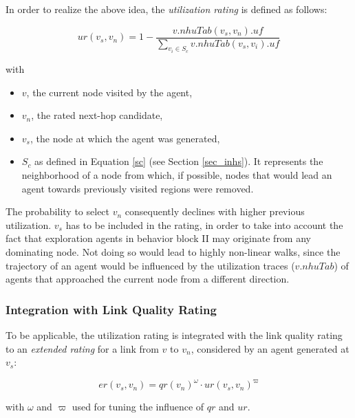 In order to realize the above idea, the \emph{utilization rating} is defined as follows:

	\begin{equation}
	   ur(v_s,v_n)=1 - \frac{v.nhuTab(v_s, v_n).uf}{\sum_{v_i \in S_{c}}{v.nhuTab(v_s, v_i).uf}}
	\label{ur}
	\end{equation}
	
with 

\begin{itemize}

	\item $v$, the current node visited by the agent,
	
	\item $v_n$, the rated next-hop candidate,
	
	\item $v_s$, the node at which the agent was generated,
	
	\item $S_c$ as defined in Equation \ref{sc} (see Section \ref{sec_inhs}). It represents the neighborhood of a node from which, if possible, nodes that would lead an agent towards previously visited regions were removed.

\end{itemize}

The probability to select $v_n$ consequently declines with higher previous utilization. $v_s$ has to be included in the rating, in order to take into account the fact that exploration agents in behavior block II may originate from any dominating node. Not doing so would lead to highly non-linear walks, since the trajectory of an agent would be influenced by the utilization traces ($v.nhuTab$) of agents that approached the current node from a different direction.

\subsubsection{Integration with Link Quality Rating}\label{sec_iwnhqr}\label{sec_iwnh}\label{sec_iwlq}

To be applicable, the utilization rating is integrated with the link quality rating to an \emph{extended rating} for a link from $v$ to $v_n$, considered by an agent generated at $v_s$:

\begin{equation} \label{er}
	er(v_s,v_n) = qr(v_n)^\omega \cdot ur(v_s,v_n)^\varpi
\end{equation}

with $\omega$ and $\varpi$ used for tuning the influence of $qr$ and $ur$. 


